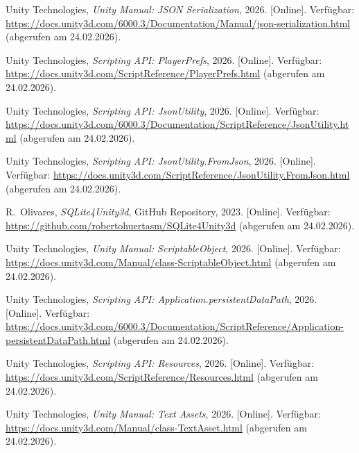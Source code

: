 \documentclass[12pt,a4paper]{article}
\begin{document}
\begin{description}[leftmargin=2em]
    \item[{[1]}] Unity Technologies, \textit{Unity Manual: JSON Serialization}, 2026. [Online]. Verfügbar: \url{https://docs.unity3d.com/6000.3/Documentation/Manual/json-serialization.html} (abgerufen am 24.02.2026).

    \item[{[2]}] Unity Technologies, \textit{Scripting API: PlayerPrefs}, 2026. [Online]. Verfügbar: \url{https://docs.unity3d.com/ScriptReference/PlayerPrefs.html} (abgerufen am 24.02.2026).

    \item[{[4]}] Unity Technologies, \textit{Scripting API: JsonUtility}, 2026. [Online]. Verfügbar: \url{https://docs.unity3d.com/6000.3/Documentation/ScriptReference/JsonUtility.html} (abgerufen am 24.02.2026).

    \item[{[5]}] Unity Technologies, \textit{Scripting API: JsonUtility.FromJson}, 2026. [Online]. Verfügbar: \url{https://docs.unity3d.com/ScriptReference/JsonUtility.FromJson.html} (abgerufen am 24.02.2026).

    \item[{[7]}] R.~Olivares, \textit{SQLite4Unity3d}, GitHub Repository, 2023. [Online]. Verfügbar: \url{https://github.com/robertohuertasm/SQLite4Unity3d} (abgerufen am 24.02.2026).

    \item[{[8]}] Unity Technologies, \textit{Unity Manual: ScriptableObject}, 2026. [Online]. Verfügbar: \url{https://docs.unity3d.com/Manual/class-ScriptableObject.html} (abgerufen am 24.02.2026).

    \item[{[9]}] Unity Technologies, \textit{Scripting API: Application.persistentDataPath}, 2026. [Online]. Verfügbar: \url{https://docs.unity3d.com/6000.3/Documentation/ScriptReference/Application-persistentDataPath.html} (abgerufen am 24.02.2026).

    \item[{[10]}] Unity Technologies, \textit{Scripting API: Resources}, 2026. [Online]. Verfügbar: \url{https://docs.unity3d.com/ScriptReference/Resources.html} (abgerufen am 24.02.2026).

    \item[{[11]}] Unity Technologies, \textit{Unity Manual: Text Assets}, 2026. [Online]. Verfügbar: \url{https://docs.unity3d.com/Manual/class-TextAsset.html} (abgerufen am 24.02.2026).


\end{description}
\end{document}
